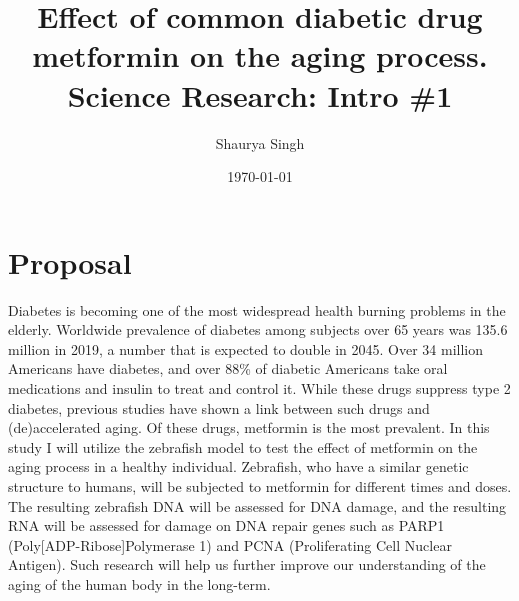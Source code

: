 \documentclass{scrartcl}
\author{Shaurya Singh}
\date{\today}
\title{Effect of common diabetic drug metformin on the aging process.\\\medskip
\large Science Research: Intro \#1}
\begin{document}
\maketitle
\setcounter{tocdepth}{2}
\tableofcontents


\section{Proposal}
\label{sec:org3889c7e}
Diabetes is becoming one of the most widespread health burning problems in the elderly. Worldwide prevalence of diabetes among subjects over 65 years was 135.6 million in 2019, a number that is expected to double in 2045. Over 34 million Americans have diabetes, and over 88\% of diabetic Americans take oral medications and insulin to treat and control it. While these drugs suppress type 2 diabetes, previous studies have shown a link between such drugs and (de)accelerated aging. Of these drugs, metformin is the most prevalent. In this study I will utilize the zebrafish model to test the effect of metformin on the aging process in a healthy individual. Zebrafish, who have a similar genetic structure to humans, will be subjected to metformin for different times and doses. The resulting zebrafish DNA will be assessed for DNA damage, and the resulting RNA will be assessed for damage on DNA repair genes such as PARP1 (Poly[ADP-Ribose]Polymerase 1) and PCNA (Proliferating Cell Nuclear Antigen). Such research will help us further improve our understanding of the aging of the human body in the long-term.
\end{document}
